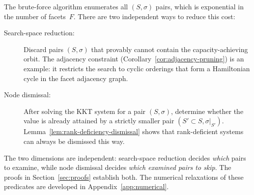 \begin{remark}\label{rem:two-knobs}
The brute-force algorithm enumerates all $(S, \sigma)$ pairs,
which is exponential in the number of facets~$F$.
There are two independent ways to reduce this cost:
\begin{description}
\item[Search-space reduction:]
  Discard pairs $(S, \sigma)$ that provably cannot contain the
  capacity-achieving orbit.
  The adjacency constraint
  (Corollary~\ref{cor:adjacency-pruning})
  is an example: it restricts the search to cyclic orderings that
  form a Hamiltonian cycle in the facet adjacency graph.
\item[Node dismissal:]
  After solving the KKT system for a pair $(S, \sigma)$,
  determine whether the value is already attained by a
  strictly smaller pair $(S' \subset S, \sigma|_{S'})$.
  Lemma~\ref{lem:rank-deficiency-dismissal} shows that
  rank-deficient systems can always be dismissed this way.
\end{description}
The two dimensions are independent: search-space reduction
decides \emph{which} pairs to examine, while node dismissal
decides \emph{which examined pairs to skip}.
The proofs in Section~\ref{sec:proofs} establish both.
The numerical relaxations of these predicates are developed
in Appendix~\ref{app:numerical}.
\end{remark}

